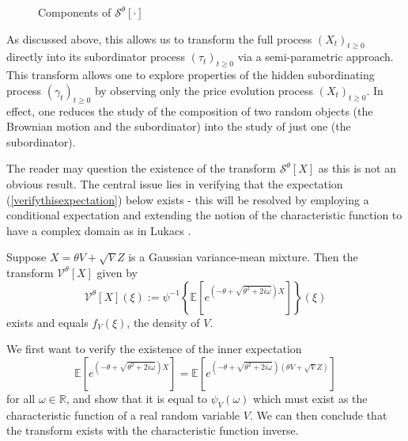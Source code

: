 \documentclass{article}
\begin{document}
\begin{remark}
\begin{figure}[h!]
\begin{tikzpicture}[scale=1.5]
        \end{tikzpicture}
        \caption{Components of $\mathcal{S}^{\theta}[\cdot]$}
        \label{Compositionmappingfigure}
\end{figure}
    As discussed above, this allows us to transform the full process $(X_t)_{t\geq0}$ directly into its subordinator process $(\tau_t)_{t\geq0}$ via a semi-parametric approach. This transform allows one to explore properties of the hidden subordinating process $(\gamma_t)_{t\geq0}$ by observing only the price evolution process $(X_t)_{t\geq0}$. In effect, one reduces the study of the composition of two random objects (the Brownian motion and the subordinator) into the study of just one (the subordinator).
\end{remark}

The reader may question the existence of the transform $\mathcal{S}^\theta\left[X\right]$ as this is not an obvious result. The central issue lies in verifying that the expectation (\ref{verifythisexpectation}) below exists - this will be resolved by employing a conditional expectation and extending the notion of the characteristic function to have a complex domain as in Lukacs \cite{Lukacs}.

\begin{prop}\label{existenceprop}
    Suppose $X = \theta V + \sqrt{V}Z$ is a Gaussian variance-mean mixture. Then the transform $\mathcal{V}^\theta[X]$ given by
    \begin{equation}\label{variancemixtureverification}
    \mathcal{V}^\theta\left[X\right](\xi) :=
    \psi^{-1}\left\{\mathbb{E}\left[e^{\left(-\theta+\sqrt{\theta^2+2i\omega}\right)X}\right]\right\}(\xi)
    \end{equation}
    exists and equals $f_V(\xi)$, the density of $V$.
\end{prop}

We first want to verify the existence of the inner expectation
\begin{equation}\label{verifythisexpectation}
    \mathbb{E}\left[e^{\left(-\theta+\sqrt{\theta^2+2i\omega}\right)X}\right] = \mathbb{E}\left[e^{\left(-\theta+\sqrt{\theta^2+2i\omega}\right)\left(\theta V+\sqrt{V}Z\right)}\right]
\end{equation}
for all $\omega\in\mathbb{R}$, and show that it is equal to $\psi_V(\omega)$ which must exist as the characteristic function of a real random variable $V$. We can then conclude that the transform exists with the characteristic function inverse.
\end{document}
